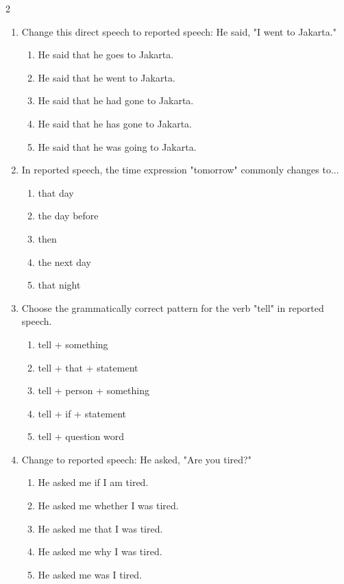 \documentclass[10pt,a4paper]{article}
\begin{document}
\begin{multicols}{2}
\begin{enumerate}
    \item Change this direct speech to reported speech: He said, "I went to Jakarta."
    \begin{enumerate}
      \item He said that he goes to Jakarta.
      \item He said that he went to Jakarta.
      \item He said that he had gone to Jakarta.
      \item He said that he has gone to Jakarta.
      \item He said that he was going to Jakarta.
    \end{enumerate}

    \item In reported speech, the time expression "tomorrow" commonly changes to...
    \begin{enumerate}
      \item that day
      \item the day before
      \item then
      \item the next day
      \item that night
    \end{enumerate}

    \item Choose the grammatically correct pattern for the verb "tell" in reported speech.
    \begin{enumerate}
      \item tell + something
      \item tell + that + statement
      \item tell + person + something
      \item tell + if + statement
      \item tell + question word
    \end{enumerate}

    \item Change to reported speech: He asked, "Are you tired?"
    \begin{enumerate}
      \item He asked me if I am tired.
      \item He asked me whether I was tired.
      \item He asked me that I was tired.
      \item He asked me why I was tired.
      \item He asked me was I tired.
    \end{enumerate}


\end{enumerate}
\end{multicols}
\end{document}
